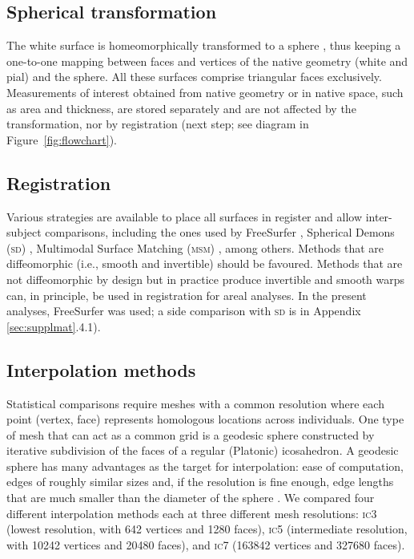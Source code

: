 \subsection{Spherical transformation}

The white surface is homeomorphically transformed to a sphere \citep{Fischl1999_intersubject}, thus keeping a one-to-one mapping between faces and vertices of the native geometry (white and pial) and the sphere. All these surfaces comprise triangular faces exclusively. Measurements of interest obtained from native geometry or in native space, such as area and thickness, are stored separately and are not affected by the transformation, nor by registration (next step; see diagram in Figure~\ref{fig:flowchart}).

\subsection{Registration}

Various strategies are available to place all surfaces in register and allow inter-subject comparisons, including the ones used by FreeSurfer \citep{Fischl1999_intersubject}, Spherical Demons (\textsc{sd}) \citep{Yeo2010}, Multimodal Surface Matching (\textsc{msm}) \citep{Robinson2014}, among others. Methods that are diffeomorphic (i.e., smooth and invertible) should be favoured. Methods that are not diffeomorphic by design but in practice produce invertible and smooth warps can, in principle, be used in registration for areal analyses. In the present analyses, FreeSurfer was used; a side comparison with \textsc{sd} is in Appendix \ref{sec:supplmat}.4.1).

\subsection{Interpolation methods}
\label{sec:cortex:interpolation}

Statistical comparisons require meshes with a common resolution where each point (vertex, face) represents homologous locations across individuals. One type of mesh that can act as a common grid is a geodesic sphere constructed by iterative subdivision of the faces of a regular (Platonic) icosahedron. A geodesic sphere has many advantages as the target for interpolation: ease of computation, edges of roughly similar sizes and, if the resolution is fine enough, edge lengths that are much smaller than the diameter of the sphere \citep{Kenner1976}. We compared four different interpolation methods each at three different mesh resolutions: \textsc{ic}3 (lowest resolution, with 642 vertices and 1280 faces), \textsc{ic}5 (intermediate resolution, with 10242 vertices and 20480 faces),  and \textsc{ic}7 (163842 vertices and 327680 faces).

